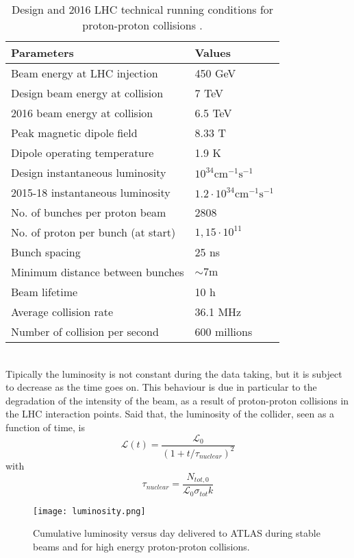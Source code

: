 \begin{table}[htb]
\caption{Design and 2016 LHC technical running conditions for proton-proton collisions \cite{LHC_parameters}.}
\centering 
\begin{tabular}{l l}
\hline\hline
\textbf{Parameters} & \textbf{Values} \\ [0.5ex]
\hline
Beam energy at LHC injection & 450 GeV \\
Design beam energy at collision & 7 TeV \\
2016 beam energy at collision & 6.5 TeV \\ [0.5ex]
\hline
Peak magnetic dipole field & 8.33 T \\
Dipole operating temperature & 1.9 K \\ [0.5ex]
\hline
Design instantaneous luminosity & $10^{34} \text{cm}^{-1}\text{s}^{-1}$ \\
2015-18 instantaneous luminosity & $1.2 \cdot 10^{34} \text{cm}^{-1}\text{s}^{-1}$ \\ [0.5ex]
\hline
No. of bunches per proton beam & 2808 \\
No. of proton per bunch (at start) & $1,15 \cdot 10^{11}$ \\
Bunch spacing & 25 ns \\
Minimum distance between bunches & $\sim 7 \text{m}$ \\ [0.5ex]
\hline
Beam lifetime & 10 h \\
Average collision rate & 36.1 MHz \\
Number of collision per second & 600 millions \\ [0.5ex]
\hline\hline
\end{tabular}
\end{table}
\\Tipically the luminosity is not constant during the data taking, but it is subject to decrease as the time goes on. This behaviour is due in particular to the degradation of the intensity of the beam, as a result of proton-proton collisions in the LHC interaction points.  Said that, the luminosity of the collider, seen as a function of time, is
\begin{equation}
\mathcal{L}(t) = \frac{\mathcal{L}_0}{(1+t/\tau_{nuclear})^2}
\end{equation}
with
\begin{equation}
\tau_{nuclear} = \frac{N_{tot,0}}{\mathcal{L}_0\sigma_{tot}k}
\end{equation}
\begin{figure}[htb]
\centering
\texttt{[image: luminosity.png]}
\caption{Cumulative luminosity versus day delivered to ATLAS during stable beams and for high energy proton-proton collisions.}
\end{figure}
